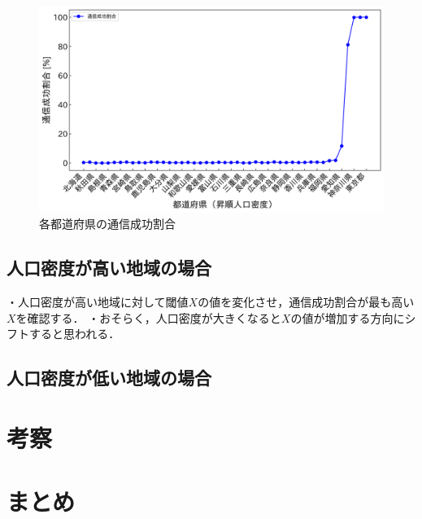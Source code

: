 \documentclass[a4paper, 11pt]{ltjsarticle}
\begin{document}
\begin{figure}[h]
  \centering
  \includegraphics[width=150mm]{通信成功率グラフ.png}
  \caption{各都道府県の通信成功割合}
  \label{figure:各都道府県の通信成功割合}
\end{figure}

\subsection{人口密度が高い地域の場合}
・人口密度が高い地域に対して閾値$X$の値を変化させ，通信成功割合が最も高い$X$を確認する．
・おそらく，人口密度が大きくなると$X$の値が増加する方向にシフトすると思われる．

\subsection{人口密度が低い地域の場合}

\clearpage
\section{考察}

\section{まとめ}

\clearpage


\end{document}
